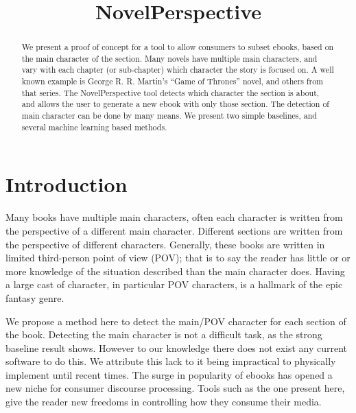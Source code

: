 \documentclass[11pt,a4paper]{article}
\title{NovelPerspective}
\begin{document}
\maketitle

\begin{abstract}
We present a proof of concept for a tool to allow consumers to subset ebooks, based on the main character of the section.
Many novels have multiple main characters, and vary with each chapter (or sub-chapter) which character the story is focused on.
A well known example is George R. R. Martin's ``Game of Thrones'' novel, and others from that series.
The NovelPerspective tool detects which character the section is about,
and allows the user to generate a new ebook with only those section.
The detection of main character can be done by many means.
We present two simple baselines, and several machine learning based methods.
\end{abstract}

\section{Introduction}

Many books have multiple main characters, often each character is written from the perspective of a different main character.
Different sections are written from the perspective of different characters.
Generally, these books are written in limited third-person point of view (POV);
that is to say the reader has little or or more knowledge of the situation described than the main character does.
Having a large cast of character, in particular POV characters, is a hallmark of the epic fantasy genre.

We propose a method here to detect the main/POV character for each section of the book.
Detecting the main character is not a difficult task, as the strong baseline result shows.
However to our knowledge there does not exist any current software to do this.
We attribute this lack to it being impractical to physically implement until recent times.
The surge in popularity of ebooks has opened a new niche for consumer discourse processing.
Tools such as the one present here, give the reader new freedoms in controlling how they consume their media.
\end{document}
